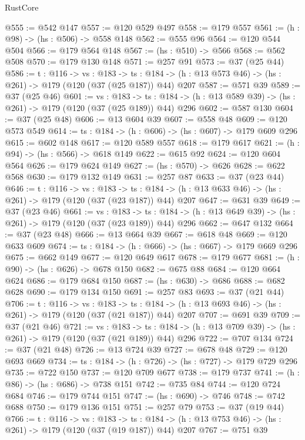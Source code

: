 \begin{lexlean}{RustCore}
\begin{coremodule}
@555 := @542 @147
@557 := @120 @529 @497
@558 := @179 @557
@561 := (h : @98) -> (hs : @506) -> @558 @148
@562 := @555 @96
@564 := @120 @544 @504
@566 := @179 @564 @148
@567 := (hs : @510) -> @566
@568 := @562 @508
@570 := @179 @130 @148
@571 := @257 @91
@573 := @37 (@25 @44)
@586 := {t : @116} ->
  {vs : @183} ->
  {ts : @184} -> (h : @13 @573 @46) -> (hs : @261) -> @179 (@120 (@37 (@25 @187)) @44) @207
@587 := @571 @39
@589 := @37 (@25 @46)
@601 := {vs : @183} ->
  {ts : @184} -> (h : @13 @589 @39) -> (hs : @261) -> @179 (@120 (@37 (@25 @189)) @44) @296
@602 := @587 @130
@604 := @37 (@25 @48)
@606 := @13 @604 @39
@607 := @558 @48
@609 := @120 @573 @549
@614 := {ts : @184} -> (h : @606) -> (hs : @607) -> @179 @609 @296
@615 := @602 @148
@617 := @120 @589 @557
@618 := @179 @617
@621 := (h : @94) -> (hs : @566) -> @618 @149
@622 := @615 @92
@624 := @120 @604 @564
@626 := @179 @624 @149
@627 := (hs : @570) -> @626
@628 := @622 @568
@630 := @179 @132 @149
@631 := @257 @87
@633 := @37 (@23 @44)
@646 := {t : @116} ->
  {vs : @183} ->
  {ts : @184} -> (h : @13 @633 @46) -> (hs : @261) -> @179 (@120 (@37 (@23 @187)) @44) @207
@647 := @631 @39
@649 := @37 (@23 @46)
@661 := {vs : @183} ->
  {ts : @184} -> (h : @13 @649 @39) -> (hs : @261) -> @179 (@120 (@37 (@23 @189)) @44) @296
@662 := @647 @132
@664 := @37 (@23 @48)
@666 := @13 @664 @39
@667 := @618 @48
@669 := @120 @633 @609
@674 := {ts : @184} -> (h : @666) -> (hs : @667) -> @179 @669 @296
@675 := @662 @149
@677 := @120 @649 @617
@678 := @179 @677
@681 := (h : @90) -> (hs : @626) -> @678 @150
@682 := @675 @88
@684 := @120 @664 @624
@686 := @179 @684 @150
@687 := (hs : @630) -> @686
@688 := @682 @628
@690 := @179 @134 @150
@691 := @257 @83
@693 := @37 (@21 @44)
@706 := {t : @116} ->
  {vs : @183} ->
  {ts : @184} -> (h : @13 @693 @46) -> (hs : @261) -> @179 (@120 (@37 (@21 @187)) @44) @207
@707 := @691 @39
@709 := @37 (@21 @46)
@721 := {vs : @183} ->
  {ts : @184} -> (h : @13 @709 @39) -> (hs : @261) -> @179 (@120 (@37 (@21 @189)) @44) @296
@722 := @707 @134
@724 := @37 (@21 @48)
@726 := @13 @724 @39
@727 := @678 @48
@729 := @120 @693 @669
@734 := {ts : @184} -> (h : @726) -> (hs : @727) -> @179 @729 @296
@735 := @722 @150
@737 := @120 @709 @677
@738 := @179 @737
@741 := (h : @86) -> (hs : @686) -> @738 @151
@742 := @735 @84
@744 := @120 @724 @684
@746 := @179 @744 @151
@747 := (hs : @690) -> @746
@748 := @742 @688
@750 := @179 @136 @151
@751 := @257 @79
@753 := @37 (@19 @44)
@766 := {t : @116} ->
  {vs : @183} ->
  {ts : @184} -> (h : @13 @753 @46) -> (hs : @261) -> @179 (@120 (@37 (@19 @187)) @44) @207
@767 := @751 @39

\end{coremodule}
\end{lexlean}
